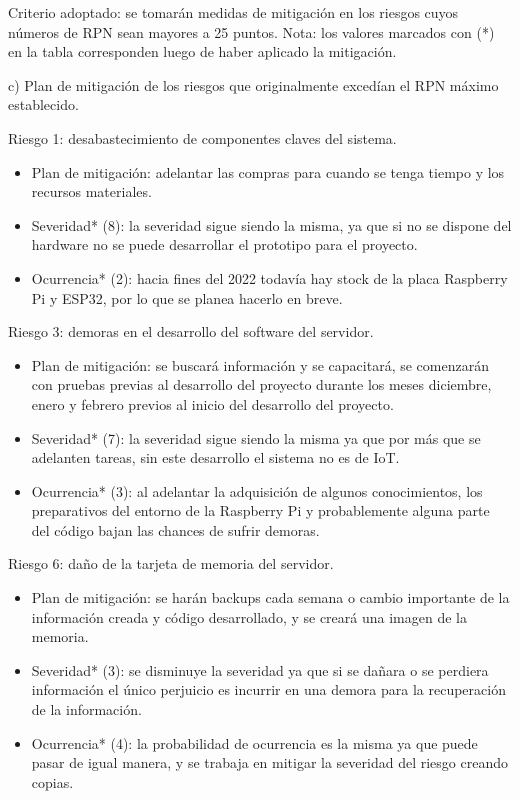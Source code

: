 \documentclass[
11pt, %
]{charter}
\begin{document}
Criterio adoptado: se tomarán medidas de mitigación en los riesgos cuyos números de RPN sean mayores a 25 puntos.
Nota: los valores marcados con (*) en la tabla corresponden luego de haber aplicado la mitigación.

c) Plan de mitigación de los riesgos que originalmente excedían el RPN máximo establecido.
 
Riesgo 1: desabastecimiento de componentes claves del sistema.
\begin{itemize}
	\item Plan de mitigación: adelantar las compras para cuando se tenga tiempo y los recursos materiales.
	\item Severidad* (8): la severidad sigue siendo la misma, ya que si no se dispone del hardware no se puede desarrollar el prototipo para el proyecto.
	\item Ocurrencia* (2): hacia fines del 2022 todavía hay stock de la placa Raspberry Pi y ESP32, por lo que se planea hacerlo en breve.
\end{itemize}
  
Riesgo 3: demoras en el desarrollo del software del servidor.
\begin{itemize}
	\item Plan de mitigación: se buscará información y se capacitará, se comenzarán con pruebas previas al desarrollo del proyecto durante los meses diciembre, enero y febrero previos al inicio del desarrollo del proyecto.
	\item Severidad* (7): la severidad sigue siendo la misma ya que por más que se adelanten tareas, sin este desarrollo el sistema no es de IoT.
	\item Ocurrencia* (3): al adelantar la adquisición de algunos conocimientos, los preparativos del entorno de la Raspberry Pi y probablemente alguna parte del código bajan las chances de sufrir demoras.
\end{itemize}

Riesgo 6: daño de la tarjeta de memoria del servidor.
\begin{itemize}
	\item Plan de mitigación: se harán backups cada semana o cambio importante de la información creada y código desarrollado, y se creará una imagen de la memoria.
	\item Severidad* (3): se disminuye la severidad ya que si se dañara o se perdiera información el único perjuicio es incurrir en una demora para la recuperación de la información.
	\item Ocurrencia* (4): la probabilidad de ocurrencia es la misma ya que puede pasar de igual manera, y se trabaja en mitigar la severidad del riesgo creando copias.
\end{itemize}
\end{document}
